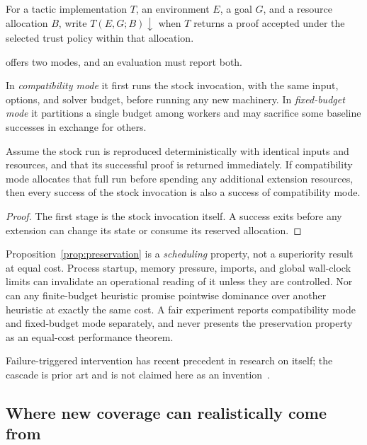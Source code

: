 \begin{definition}
For a tactic implementation $T$, an environment $E$, a goal $G$, and a
resource allocation $B$, write $T(E,G;B)\downarrow$ when $T$ returns a proof
accepted under the selected trust policy within that allocation.
\end{definition}

\forge{} offers two modes, and an evaluation must report both.

In \emph{compatibility mode} it first runs the stock \grind{} invocation, with
the same input, options, and solver budget, before running any new machinery.
In \emph{fixed-budget mode} it partitions a single budget among workers and
may sacrifice some baseline successes in exchange for others.

\begin{proposition}
\label{prop:preservation}
Assume the stock run is reproduced deterministically with identical inputs and
resources, and that its successful proof is returned immediately. If
compatibility mode allocates that full run before spending any additional
extension resources, then every success of the stock invocation is also a
success of compatibility mode.
\end{proposition}
\begin{proof}
The first stage is the stock invocation itself. A success exits before any
extension can change its state or consume its reserved allocation.
\end{proof}

Proposition~\ref{prop:preservation} is a \emph{scheduling} property, not a
superiority result at equal cost. Process startup, memory pressure, imports,
and global wall-clock limits can invalidate an operational reading of it
unless they are controlled. Nor can any finite-budget heuristic promise
pointwise dominance over another heuristic at exactly the same cost. A fair
experiment reports compatibility mode and fixed-budget mode separately, and
never presents the preservation property as an equal-cost performance theorem.

Failure-triggered intervention has recent precedent in research on \grind{}
itself; the cascade is prior art and is not claimed here as an
invention~\cite{learned-interventions}.

\subsection{Where new coverage can realistically come from}

